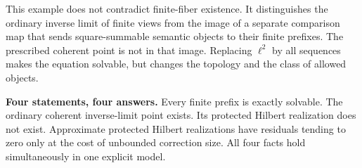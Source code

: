 This example does not contradict finite-fiber existence. It distinguishes the ordinary inverse limit of finite views from the image of a separate comparison map that sends square-summable semantic objects to their finite prefixes. The prescribed coherent point is not in that image. Replacing \(\ell^2\) by all sequences makes the equation solvable, but changes the topology and the class of allowed objects.

\begin{insight}
\textbf{Four statements, four answers.} Every finite prefix is exactly solvable. The ordinary coherent inverse-limit point exists. Its protected Hilbert realization does not exist. Approximate protected Hilbert realizations have residuals tending to zero only at the cost of unbounded correction size. All four facts hold simultaneously in one explicit model.
\end{insight}
